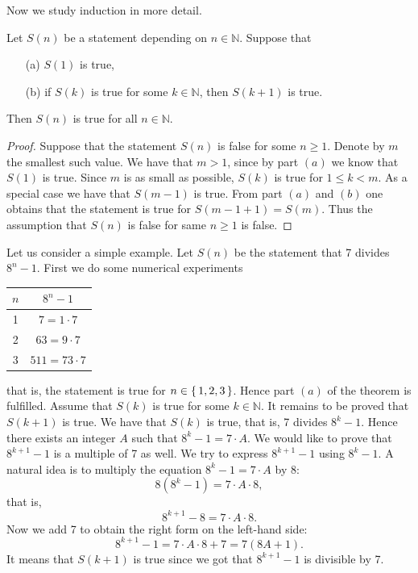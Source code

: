 Now we study induction in more detail.
\begin{theorem}
Let $S(n)$ be a statement depending on $n\in\mathbb{N}$. Suppose that 
\begin{enumerate}
\item[(a)] $S(1)$ is true,
\item[(b)] if $S(k)$ is true for some $k\in\mathbb{N}$, then $S(k+1)$ is true.
\end{enumerate}
Then $S(n)$ is true for all $n\in\mathbb{N}$.
\end{theorem}
\begin{proof}
Suppose that the statement $S(n)$ is false for some $n\geq 1$. Denote by $m$ the smallest such value.
We have that $m>1$, since by part $(a)$ we know that $S(1)$ is true. Since $m$ is as small as possible, $S(k)$ is true for $1\leq k < m$.
As a special case we have that $S(m-1)$ is true. From part $(a)$ and $(b)$ one obtains that the statement is true for $S(m-1+1)=S(m)$.
Thus the assumption that $S(n)$ is false for same $n\geq 1$ is false.
\end{proof}
Let us consider a simple example. Let $S(n)$ be the statement that 7 divides $8^n-1$. First we do some numerical experiments
\begin{center}
\begin{tabular}{|c|c|}
\hline
$n$ & $8^n-1$\\
\hline
1 & $7=1\cdot 7$\\
\hline
2 & $63=9\cdot 7$\\
\hline
3 & $511=73\cdot 7$ \\
\hline
\end{tabular}
\end{center}
that is, the statement is true for $n\in\left\{\,1,2,3\,\right\}$. Hence part $(a)$ of the theorem is fulfilled. Assume that $S(k)$ is true for some
$k\in\mathbb{N}$. It remains to be proved that $S(k+1)$ is true. We have that $S(k)$ is true, that is, 7 divides $8^k-1$. Hence there exists
an integer $A$ such that $8^k-1=7\cdot A$. We would like to prove that $8^{k+1}-1$ is a multiple of 7 as well. We try to express $8^{k+1}-1$
using $8^k-1$. A natural idea is to multiply the equation $8^k-1=7\cdot A$ by 8:
$$
8(8^k-1)=7\cdot A\cdot 8,
$$
that is, 
$$
8^{k+1}-8=7\cdot A\cdot 8.
$$
Now we add 7 to obtain the right form on the left-hand side:
$$
8^{k+1}-1=7\cdot A\cdot 8+7=7(8A+1).
$$
It means that $S(k+1)$ is true since we got that $8^{k+1}-1$ is divisible by 7.

